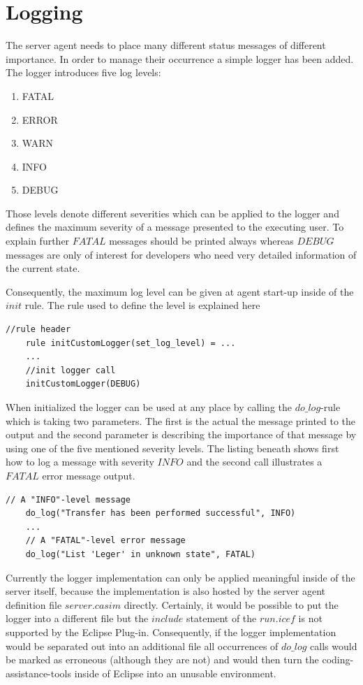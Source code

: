 \section{Logging}
\label{sec:impl-log}

The server agent needs to place many different status messages of different importance. In order to manage their occurrence a simple logger has been added. The logger introduces five log levels:

\begin{enumerate}
	\item FATAL
	\item ERROR
	\item WARN
	\item INFO
	\item DEBUG
\end{enumerate}

Those levels denote different severities which can be applied to the logger and defines the maximum severity of a message presented to the executing user. To explain further $FATAL$ messages should be printed always whereas $DEBUG$ messages are only of interest for developers who need very detailed information of the current state.

Consequently, the maximum log level can be given at agent start-up inside of the $init$ rule. The rule used to define the level is explained here

\begin{lstlisting}[language=bsl]
	//rule header
	rule initCustomLogger(set_log_level) = ...
	...
	//init logger call
	initCustomLogger(DEBUG)
\end{lstlisting}

When initialized the logger can be used at any place by calling the $do\_log$-rule which is taking two parameters. The first is the actual the message printed to the output and the second parameter is describing the importance of that message by using one of the five mentioned severity levels. The listing beneath shows first how to log a message with severity $INFO$ and the second call illustrates a $FATAL$ error message output.
	
\begin{lstlisting}[language=bsl]
	// A "INFO"-level message
	do_log("Transfer has been performed successful", INFO)
	...
	// A "FATAL"-level error message
	do_log("List 'Leger' in unknown state", FATAL)
\end{lstlisting}

Currently the logger implementation can only be applied meaningful inside of the server itself, because the implementation is also hosted by the server agent definition file $server.casim$ directly. Certainly, it would be possible to put the logger into a different file but the $include$ statement of the $run.icef$ is not supported by the Eclipse Plug-in. Consequently, if the logger implementation would be separated out into an additional file all occurrences of $do\_log$ calls would be marked as erroneous (although they are not) and would then turn the coding-assistance-tools inside of Eclipse into an unusable environment.


